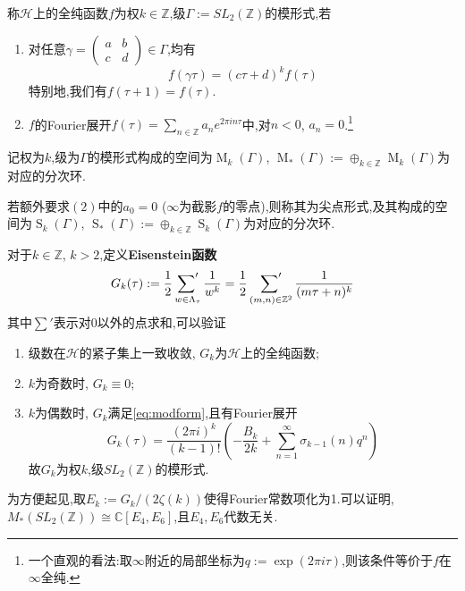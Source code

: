 \begin{defn}
	称$\mathcal{H}$上的全纯函数$f$为权$k \in \mathbb{Z}$,级$\Gamma:= SL_2(\mathbb{Z})$的模形式,若
	
	\begin{enumerate}[(1)]
		\item 对任意$\gamma=\begin{pmatrix}
		a & b\\
		c & d
		\end{pmatrix}\in \Gamma$,均有
		\begin{equation}\label{eq:modform}
		f(\gamma \tau)=(c \tau +d)^k f(\tau)
		\end{equation}
		特别地,我们有$f(\tau+1)=f(\tau)$.
		\item $f$的Fourier展开$f(\tau)=\sum_{n \in \mathbb{Z}}a_ne^{2\pi i n \tau}$中,对$n < 0$, $a_n =0$.\footnote{一个直观的看法:取$\infty$附近的局部坐标为$q:=\exp(2\pi i \tau)$,则该条件等价于$f$在$\infty$全纯.}
	\end{enumerate}
	记权为$k$,级为$\Gamma$的模形式构成的空间为$\operatorname{M}_k(\Gamma)$, $\operatorname{M}_{*}(\Gamma):= \oplus_{k \in \mathbb{Z}}\operatorname{M}_k(\Gamma)$为对应的分次环.
	
	若额外要求$(2)$中的$a_0=0$ ($\infty$为截影$f$的零点),则称其为尖点形式,及其构成的空间为$\operatorname{S}_k(\Gamma)$, $\operatorname{S}_{*}(\Gamma):= \oplus_{k \in \mathbb{Z}}\operatorname{S}_k(\Gamma)$为对应的分次环.
\end{defn}

\begin{exercise}
	对于$k \in \mathbb{Z}$, $k>2$,定义\textbf{Eisenstein函数}
	$$G_k(\tau):= \frac{1}{2}\mathop{\mathord{\sum}'}_{w \in \Lambda_{\tau}} \frac{1}{w^k}=\frac{1}{2} \mathop{\mathord{\sum}'}_{(m,n) \in \mathbb{Z}^2} \frac{1}{(m\tau +n)^k}$$
	其中$\sum'$表示对0以外的点求和,可以验证
	\begin{enumerate}
		\item 级数在$\mathcal{H}$的紧子集上一致收敛, $G_k$为$\mathcal{H}$上的全纯函数;
		\item $k$为奇数时, $G_k \equiv 0$;
		\item $k$为偶数时, $G_k$满足\eqref{eq:modform},且有Fourier展开
		$$G_k(\tau)=\frac{(2\pi i)^k}{(k-1)!} \left( -\frac{B_k}{2k}+\sum_{n=1}^{\infty}\sigma_{k-1}(n)q^n \right)$$
		故$G_k$为权$k$,级$SL_2(\mathbb{Z})$的模形式.
	\end{enumerate}
\end{exercise}

为方便起见,取$E_k:= G_k/(2\zeta(k))$使得Fourier常数项化为1.可以证明, $M_{*}(SL_2(\mathbb{Z})) \cong \mathbb{C}[E_4,E_6]$,且$E_4,E_6$代数无关.

